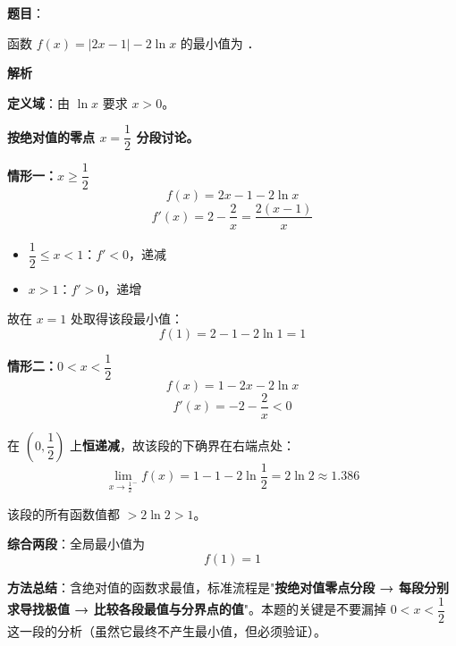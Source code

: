 \begin{answer}

\textbf{题目}：

函数 $f(x)=|2x-1|-2\ln x$ 的最小值为 \gkblank{}．

\textbf{解析}

\textbf{定义域}：由 $\ln x$ 要求 $x>0$。

\textbf{按绝对值的零点 $x=\dfrac12$ 分段讨论。}

\par\medskip

\textbf{情形一：$x\ge\dfrac12$}
\nopagebreak[4]
\[f(x)=2x-1-2\ln x\]
\nopagebreak[4]
\[f'(x)=2-\frac2x=\frac{2(x-1)}x\]

\begin{itemize}
\item $\dfrac12\le x<1$：$f'<0$，递减
\item $x>1$：$f'>0$，递增
\end{itemize}

故在 $x=1$ 处取得该段最小值：
\nopagebreak[4]
\[f(1)=2-1-2\ln1=1\]

\par\medskip

\textbf{情形二：$0<x<\dfrac12$}
\nopagebreak[4]
\[f(x)=1-2x-2\ln x\]
\nopagebreak[4]
\[f'(x)=-2-\frac2x<0\]

在 $\left(0,\dfrac12\right)$ 上\textbf{恒递减}，故该段的下确界在右端点处：
\nopagebreak[4]
\[\lim_{x\to\frac12^{-}}f(x)=1-1-2\ln\frac12=2\ln2\approx1.386\]

该段的所有函数值都 $>2\ln2>1$。

\par\medskip

\textbf{综合两段}：全局最小值为
\nopagebreak[4]
\[f(1)=1\]

\begin{gktip}
\textbf{方法总结}：含绝对值的函数求最值，标准流程是"\textbf{按绝对值零点分段 → 每段分别求导找极值 → 比较各段最值与分界点的值}"。本题的关键是不要漏掉 $0<x<\dfrac12$ 这一段的分析（虽然它最终不产生最小值，但必须验证）。
\end{gktip}


\par\medskip

\end{answer}
